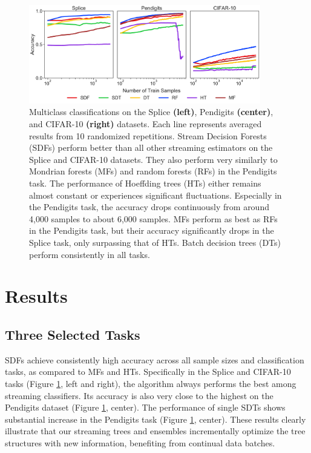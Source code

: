 \begin{figure}[!htb]
\centering
\includegraphics[width=0.9\textwidth]{select_acc}
  \caption{Multiclass classifications on the Splice \textbf{(left)}, Pendigits \textbf{(center)}, and CIFAR-10 \textbf{(right)} datasets. 
  Each line represents averaged results from 10 randomized repetitions. Stream Decision Forests (SDFs) perform better than all other streaming estimators on the Splice and CIFAR-10 datasets. They also perform very similarly to Mondrian forests (MFs) and random forests (RFs) in the Pendigits task. The performance of Hoeffding trees (HTs) either remains almost constant or experiences significant fluctuations. Especially in the Pendigits task, the accuracy drops continuously from around 4,000 samples to about 6,000 samples. MFs perform as best as RFs in the Pendigits task, but their accuracy significantly drops in the Splice task, only surpassing that of HTs. Batch decision trees (DTs) perform consistently in all tasks.
  }
\label{fig:select_acc}
\end{figure}

\section{Results}
\label{results}

\subsection{Three Selected Tasks}
\label{results:select}
SDFs achieve consistently high accuracy across all sample sizes and classification tasks, as compared to MFs and HTs. Specifically in the Splice and CIFAR-10 tasks (Figure \ref{fig:select_acc}, left and right), the algorithm always performs the best among streaming classifiers. Its accuracy is also very close to the highest on the Pendigits dataset (Figure \ref{fig:select_acc}, center). 
The performance of single SDTs shows substantial increase in the Pendigits task (Figure \ref{fig:select_acc}, center). 
These results clearly illustrate that our streaming trees and ensembles incrementally optimize the tree structures with new information, benefiting from continual data batches.

